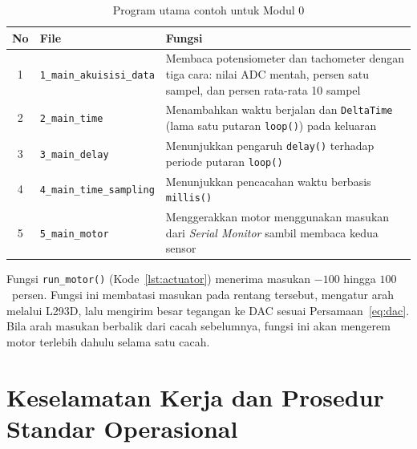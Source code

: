 \documentclass[11pt,a4paper]{article}
\newcommand{\prog}[1]{\texttt{#1}}
\begin{document}
\begin{table}[H]
	\centering
	\caption{Program utama contoh untuk Modul 0}
	\label{tab:program_utama}
	\begin{tabularx}{\textwidth}{|c|l|X|}
		\hline
		\textbf{No} & \textbf{File}                        & \textbf{Fungsi}                                                                                     \\
		\hline
		1           & \prog{1\_main\_akuisisi\_data}       & Membaca potensiometer dan tachometer dengan tiga cara: nilai ADC mentah, persen satu sampel, dan persen rata-rata 10 sampel \\
		2           & \prog{2\_main\_time}                 & Menambahkan waktu berjalan dan \texttt{DeltaTime} (lama satu putaran \texttt{loop()}) pada keluaran \\
		3           & \prog{3\_main\_delay}                & Menunjukkan pengaruh \texttt{delay()} terhadap periode putaran \texttt{loop()}                      \\
		4           & \prog{4\_main\_time\_sampling}       & Menunjukkan pencacahan waktu berbasis \texttt{millis()}                                              \\
		5           & \prog{5\_main\_motor}                & Menggerakkan motor menggunakan masukan dari \textit{Serial Monitor} sambil membaca kedua sensor     \\
		\hline
	\end{tabularx}
\end{table}

Fungsi \texttt{run\_motor()} (Kode~\ref{lst:actuator}) menerima masukan $-100$ hingga $100$~persen. Fungsi ini membatasi masukan pada rentang tersebut, mengatur arah melalui L293D, lalu mengirim besar tegangan ke DAC sesuai Persamaan~\eqref{eq:dac}. Bila arah masukan berbalik dari cacah sebelumnya, fungsi ini akan mengerem motor terlebih dahulu selama satu cacah.

\section[Keselamatan Kerja dan SOP]{Keselamatan Kerja dan Prosedur Standar Operasional}
\end{document}
